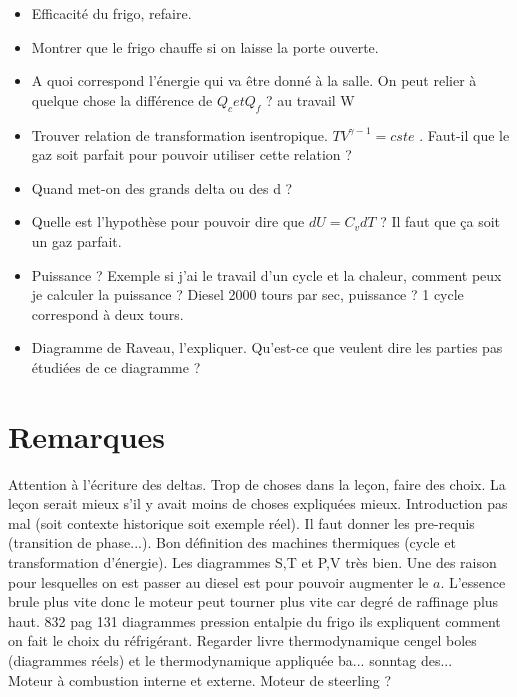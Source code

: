 \documentclass[12pt,prb,aps,epsf]{report}
\begin{document}
\begin{itemize}
	\item Efficacité du frigo, refaire.
	\item Montrer que le frigo chauffe si on laisse la porte ouverte.
	\item A quoi correspond l'énergie qui va être donné à la salle. On peut relier à quelque chose la différence de $Q_c et Q_f$ ? au travail W 
	\item Trouver relation de transformation isentropique. $TV^{\gamma -1}= cste$ . Faut-il que le gaz soit parfait pour pouvoir utiliser cette relation ?
	\item Quand met-on des grands delta ou des d ?
	\item Quelle est l'hypothèse pour pouvoir dire que $dU= C_v dT$ ? Il faut que ça soit un gaz parfait. 
	\item Puissance ? Exemple si j'ai le travail d'un cycle et la chaleur, comment peux je calculer la puissance ? Diesel 2000 tours par sec, puissance ? 1 cycle correspond à deux tours.
	\item Diagramme de Raveau, l'expliquer. Qu'est-ce que veulent dire les parties pas étudiées de ce diagramme ?
\end{itemize}


\section*{Remarques}
Attention à l'écriture des deltas. Trop de choses dans la leçon, faire des choix. La leçon serait mieux s'il y avait moins de choses expliquées mieux. Introduction pas mal (soit contexte historique soit exemple réel). Il faut donner les pre-requis (transition de phase...). Bon définition des machines thermiques (cycle et transformation d'énergie). Les diagrammes S,T et P,V très bien. Une des raison pour lesquelles on est passer au diesel est pour pouvoir augmenter le $a$. L'essence brule plus vite donc le moteur peut tourner plus vite car degré de raffinage plus haut. 832 pag 131 diagrammes pression entalpie du frigo ils expliquent comment on fait le choix du réfrigérant. Regarder livre thermodynamique cengel boles (diagrammes réels) et le thermodynamique appliquée ba... sonntag des... \\
Moteur à combustion interne et externe. Moteur de steerling ?
\end{document}

